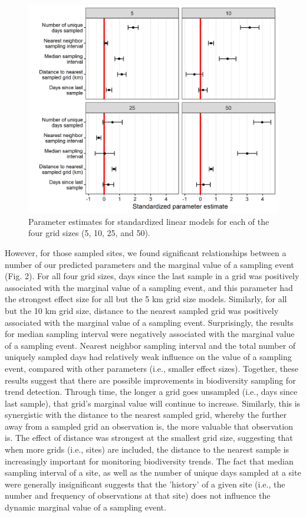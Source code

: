 \documentclass[9pt,twocolumn,twoside,lineno]{pnas-new}
\begin{document}
\begin{figure}[!hb]
\centering
\includegraphics[width=.8\linewidth]{param_estimates.png}
\caption{Parameter estimates for standardized linear models for each of the four grid sizes (5, 10, 25, and 50).}
\label{fig2}
\end{figure}

However, for those sampled sites, we found significant relationships between a number of our predicted parameters and the marginal value of a sampling event (Fig. 2). For all four grid sizes, days since the last sample in a grid was positively associated with the marginal value of a sampling event, and this parameter had the strongest effect size for all but the 5 km grid size models. Similarly, for all but the 10 km grid size, distance to the nearest sampled grid was positively associated with the marginal value of a sampling event. Surprisingly, the results for median sampling interval were negatively associated with the marginal value of a sampling event. Nearest neighbor sampling interval and the total number of uniquely sampled days had relatively weak influence on the value of a sampling event, compared with other parameters (i.e., smaller effect sizes). Together, these results suggest that there are possible improvements in biodiversity sampling for trend detection. Through time, the longer a grid goes unsampled (i.e., days since last sample), that grid's marginal value will continue to increase. Similarly, this is synergistic with the distance to the nearest sampled grid, whereby the further away from a sampled grid an observation is, the more valuable that observation is. The effect of distance was strongest at the smallest grid size, suggesting that when more grids (i.e., sites) are included, the distance to the nearest sample is increasingly important for monitoring biodiversity trends. The fact that median sampling interval of a site, as well as the number of unique days sampled at a site were generally insignificant suggests that the 'history' of a given site (i.e., the number and frequency of observations at that site) does not influence the dynamic marginal value of a sampling event.
\end{document}
